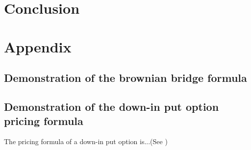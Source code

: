 \documentclass[a4paper,11pt,english]{book}
\let\cleardoublepage\clearpage
\begin{document}
\backmatter
\chapter*{Conclusion}


\newpage
\nocite{*}






\newpage
\begingroup
\let\clearpage\relax
\let\cleardoublepage\relax


\renewcommand{\thesection}{\Alph{section}}
\chapter*{Appendix}
\appendix
{}

\section{Demonstration of the brownian bridge formula}
\label{appendix:brownian-bridge}

\section{Demonstration of the down-in put option pricing formula}
\label{appendix:down-in-put}

The pricing formula of a down-in put option is...(See \cite{hull2016options})

\endgroup
\end{document}
